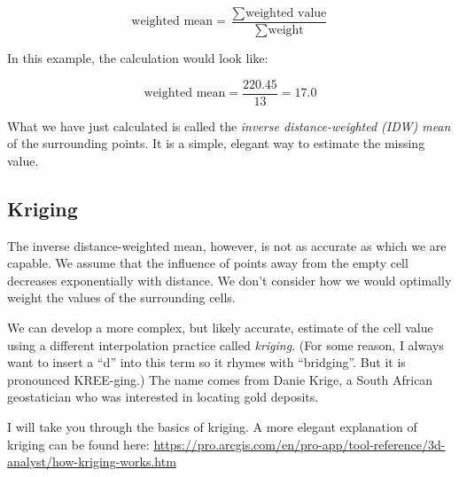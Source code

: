 \documentclass[
]{book}
\newenvironment{Shaded}{\begin{snugshade}}{\end{snugshade}}
\newcommand{\AttributeTok}[1]{\textcolor[rgb]{0.77,0.63,0.00}{#1}}
\newcommand{\ConstantTok}[1]{\textcolor[rgb]{0.00,0.00,0.00}{#1}}
\newcommand{\DecValTok}[1]{\textcolor[rgb]{0.00,0.00,0.81}{#1}}
\newcommand{\FunctionTok}[1]{\textcolor[rgb]{0.00,0.00,0.00}{#1}}
\newcommand{\NormalTok}[1]{#1}
\newcommand{\OtherTok}[1]{\textcolor[rgb]{0.56,0.35,0.01}{#1}}
\newcommand{\SpecialCharTok}[1]{\textcolor[rgb]{0.00,0.00,0.00}{#1}}
\begin{document}
\[ \text{weighted mean} = \frac{\sum{\text{weighted value}}}{\sum{\text{weight}}} \]

\begin{Shaded}
\end{Shaded}

In this example, the calculation would look like:

\[ \text{weighted mean} = \frac{220.45}{13} = 17.0\]

What we have just calculated is called the \emph{inverse distance-weighted (IDW) mean} of the surrounding points. It is a simple, elegant way to estimate the missing value.

\hypertarget{kriging}{%
\subsection{Kriging}\label{kriging}}

The inverse distance-weighted mean, however, is not as accurate as which we are capable. We assume that the influence of points away from the empty cell decreases exponentially with distance. We don't consider how we would optimally weight the values of the surrounding cells.

We can develop a more complex, but likely accurate, estimate of the cell value using a different interpolation practice called \emph{kriging}. (For some reason, I always want to insert a ``d'' into this term so it rhymes with ``bridging''. But it is pronounced KREE-ging.) The name comes from Danie Krige, a South African geostatician who was interested in locating gold deposits.

I will take you through the basics of kriging. A more elegant explanation of kriging can be found here: \url{https://pro.arcgis.com/en/pro-app/tool-reference/3d-analyst/how-kriging-works.htm}
\end{document}
